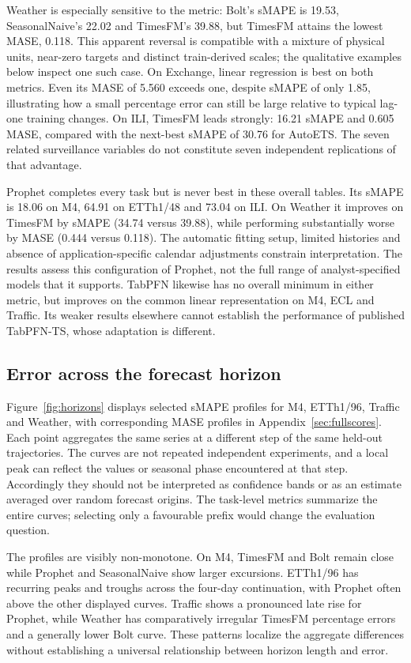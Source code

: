 Weather is especially sensitive to the metric: Bolt's sMAPE is 19.53, SeasonalNaive's 22.02 and TimesFM's 39.88, but TimesFM attains the lowest MASE, 0.118. This apparent reversal is compatible with a mixture of physical units, near-zero targets and distinct train-derived scales; the qualitative examples below inspect one such case. On Exchange, linear regression is best on both metrics. Even its MASE of 5.560 exceeds one, despite sMAPE of only 1.85, illustrating how a small percentage error can still be large relative to typical lag-one training changes. On ILI, TimesFM leads strongly: 16.21 sMAPE and 0.605 MASE, compared with the next-best sMAPE of 30.76 for AutoETS. The seven related surveillance variables do not constitute seven independent replications of that advantage.

Prophet completes every task but is never best in these overall tables. Its sMAPE is 18.06 on M4, 64.91 on ETTh1/48 and 73.04 on ILI. On Weather it improves on TimesFM by sMAPE (34.74 versus 39.88), while performing substantially worse by MASE (0.444 versus 0.118). The automatic fitting setup, limited histories and absence of application-specific calendar adjustments constrain interpretation. The results assess this configuration of Prophet, not the full range of analyst-specified models that it supports. TabPFN likewise has no overall minimum in either metric, but improves on the common linear representation on M4, ECL and Traffic. Its weaker results elsewhere cannot establish the performance of published TabPFN-TS, whose adaptation is different.

\subsection{Error across the forecast horizon}\label{sec:horizonresults}
Figure~\ref{fig:horizons} displays selected sMAPE profiles for M4, ETTh1/96, Traffic and Weather, with corresponding MASE profiles in Appendix~\ref{sec:fullscores}. Each point aggregates the same series at a different step of the same held-out trajectories. The curves are not repeated independent experiments, and a local peak can reflect the values or seasonal phase encountered at that step. Accordingly they should not be interpreted as confidence bands or as an estimate averaged over random forecast origins. The task-level metrics summarize the entire curves; selecting only a favourable prefix would change the evaluation question.

The profiles are visibly non-monotone. On M4, TimesFM and Bolt remain close while Prophet and SeasonalNaive show larger excursions. ETTh1/96 has recurring peaks and troughs across the four-day continuation, with Prophet often above the other displayed curves. Traffic shows a pronounced late rise for Prophet, while Weather has comparatively irregular TimesFM percentage errors and a generally lower Bolt curve. These patterns localize the aggregate differences without establishing a universal relationship between horizon length and error.

